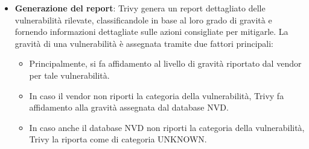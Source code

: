 \begin{itemize}
   \item \textbf{Generazione del report}: Trivy genera un report dettagliato delle vulnerabilità rilevate, classificandole in base al loro grado di gravità e fornendo informazioni dettagliate sulle azioni consigliate per mitigarle. La gravità di una vulnerabilità è assegnata tramite due fattori principali:
         \begin{itemize}
            \item Principalmente, si fa affidamento al livello di gravità riportato dal vendor per tale vulnerabilità.
            \item In caso il vendor non riporti la categoria della vulnerabilità, Trivy fa affidamento alla gravità assegnata dal database NVD.
            \item In caso anche il database NVD non riporti la categoria della vulnerabilità, Trivy la riporta come di categoria UNKNOWN.
         \end{itemize}
\end{itemize}
